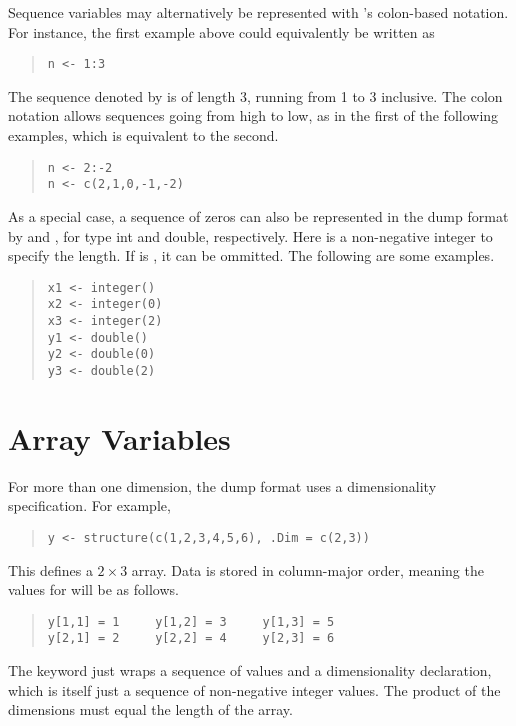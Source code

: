 Sequence variables may alternatively be represented with \R's
colon-based notation.  For instance, the first example above could
equivalently be written as
%
\begin{quote}
\begin{Verbatim} 
n <- 1:3
\end{Verbatim}
\end{quote}
% 
The sequence denoted by  is of length 3, running from 1 to 3
inclusive.  The colon notation allows sequences going from high to
low, as in the first of the following examples, which is equivalent to
the second.
%
\begin{quote}
\begin{Verbatim}
n <- 2:-2
n <- c(2,1,0,-1,-2)
\end{Verbatim}
\end{quote}
%

As a special case, a sequence of zeros can also be
represented in the dump format by  and
, for type int and double, respectively.
Here  is a non-negative integer to specify the
length. If  is , it can be ommitted. The
following are some examples.
%
\begin{quote}
\begin{Verbatim}
x1 <- integer()
x2 <- integer(0)
x3 <- integer(2)
y1 <- double()
y2 <- double(0)
y3 <- double(2)
\end{Verbatim}
\end{quote}
%


\section{Array Variables}\label{array-variables.section}

For more than one dimension, the dump format uses a dimensionality
specification.  For example,
%
\begin{quote}
\begin{verbatim}
y <- structure(c(1,2,3,4,5,6), .Dim = c(2,3))
\end{verbatim}
\end{quote}
%
This defines a $2 \times 3$ array.  Data is stored in column-major
order, meaning the values for  will be as follows.
%
\begin{quote}
\begin{Verbatim}
y[1,1] = 1     y[1,2] = 3     y[1,3] = 5    
y[2,1] = 2     y[2,2] = 4     y[2,3] = 6
\end{Verbatim}
\end{quote}
%
The  keyword just wraps a sequence of values and a
dimensionality declaration, which is itself just a sequence of
non-negative integer values.  The product of the dimensions must equal
the length of the array.

